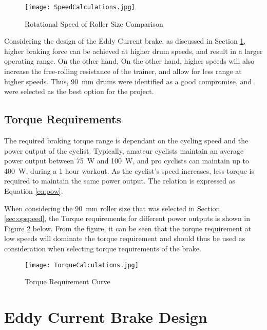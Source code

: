 \begin{figure}[H]
	\begin{center}
		\texttt{[image: SpeedCalculations.jpg]}
		\caption{Rotational Speed of Roller Size Comparison}
		\label{fig:speedCalc}
	\end{center}
\end{figure}

Considering the design of the Eddy Current brake, as discussed in Section \ref{sec:Eddy}, higher braking force can be achieved at higher drum speeds, and result in a larger operating range. On the other hand,  On the other hand, higher speeds will also increase the free-rolling resistance of the trainer, and allow for less range at higher speeds. Thus, \SI{90}{\milli\meter} drums were identified as a good compromise, and were selected as the best option for the project.\\

\subsection{Torque Requirements}

The required braking torque range is dependant on the cycling speed and the power output of the cyclist. Typically, amateur cyclists maintain an average power output between \SI{75}{\watt} and \SI{100}{\watt}, and pro cyclists can maintain up to \SI{400}{\watt}, during a 1 hour workout. As the cyclist's speed increases, less torque is required to maintain the same power output. The relation is expressed as Equation \ref{eq:pow}.

When considering the \SI{90}{\milli\meter} roller size that was selected in Section \ref{sec:opspeed}, the Torque requirements for different power outputs is shown in Figure \ref{fig:torqueCalc} below. From the figure, it can be seen that the torque requirement at low speeds will dominate the torque requirement and should thus be used as consideration when selecting torque requirements of the brake.

\begin{figure}[H]
	\begin{center}
		\texttt{[image: TorqueCalculations.jpg]}
		\caption{Torque Requirement Curve}
		\label{fig:torqueCalc}
	\end{center}
\end{figure}

\newpage

\section{Eddy Current Brake Design}
\label{sec:Eddy}

